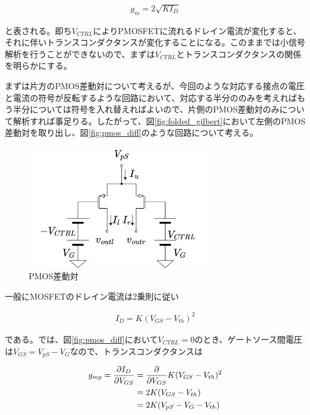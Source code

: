 \documentclass[twocolumn]{jsarticle}
\begin{document}
\begin{align}
    g_{m}=2\sqrt{KI_{D}} \label{eq:gm}
\end{align}

と表される。即ち$V_{CTRL}$によりPMOSFETに流れるドレイン電流が変化すると、それに伴いトランスコンダクタンスが変化することになる。このままでは小信号解析を行うことができないので、まずは$V_{CTRL}$とトランスコンダクタンスの関係を明らかにする。\par
まずは片方のPMOS差動対について考えるが、今回のような対応する接点の電圧と電流の符号が反転するような回路において、対応する半分ののみを考えればもう半分については符号を入れ替えればよいので、片側のPMOS差動対のみについて解析すれば事足りる。したがって、図\eqref{fig:folded_gilbert}において左側のPMOS差動対を取り出し、図\eqref{fig:pmos_diff}のような回路について考える。

\begin{figure}[h]
    \begin{center}
        \includegraphics*[width=80mm]{figures/pmos_diff.png}
        \caption{PMOS差動対}
        \label{fig:pmos_diff}
    \end{center}
\end{figure}%

一般にMOSFETのドレイン電流は2乗則に従い

\begin{align}
    I_{D}=K(V_{GS}-V_{th})^{2}  \label{eq:square}
\end{align}

である。では、図\eqref{fig:pmos_diff}において$V_{CTRL}=0$のとき、ゲートソース間電圧は$V_{GS}=V_{pS}-V_{G}$なので、トランスコンダクタンスは

\begin{align}
    g_{mp} = \frac{\partial I_{D}}{\partial V_{GS}} &= \frac{\partial}{\partial V_{GS}} K(V_{GS}-V_{th})^{2} \notag\\
    &=2K(V_{GS}-V_{th})    \notag\\ 
    &=2K(V_{pS}-V_{G}-V_{th})   \label{eq:g_mp}
\end{align}
\end{document}
